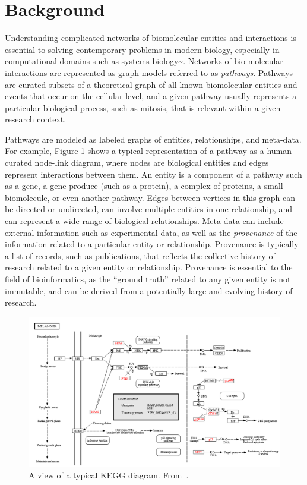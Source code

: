 \section*{Background}

Understanding complicated networks of biomolecular entities and
interactions is essential to solving contemporary problems in modern
biology, especially in computational domains such as systems
biology\textasciitilde{}\cite{hanahan2011hallmarks}. Networks of
bio-molecular interactions are represented as graph models referred to
as \emph{pathways}. Pathways are curated subsets of a theoretical graph
of all known biomolecular entities and events that occur on the cellular
level, and a given pathway usually represents a particular biological
process, such as mitosis, that is relevant within a given research
context.

Pathways are modeled as labeled graphs of entities, relationships, and
meta-data. For example, Figure \ref{fig:kvik} shows a typical
representation of a pathway as a human curated node-link diagram, where
nodes are biological entities and edges represent interactions between
them. An entity is a component of a pathway such as a gene, a gene
produce (such as a protein), a complex of proteins, a small biomolecule,
or even another pathway. Edges between vertices in this graph can be
directed or undirected, can involve multiple entities in one
relationship, and can represent a wide range of biological
relationships. Meta-data can include external information such as
experimental data, as well as the \emph{provenance} of the information
related to a particular entity or relationship. Provenance is typically
a list of records, such as publications, that reflects the collective
history of research related to a given entity or relationship.
Provenance is essential to the field of bioinformatics, as the ``ground
truth'' related to any given entity is not immutable, and can be derived
from a potentially large and evolving history of research.

\begin{figure}[htb]
  \centering
  \includegraphics[width=\linewidth]{figures/kegg2}
  \caption{\label{fig:kvik} A view of a typical KEGG diagram. From~\cite{Fjukstad2014kvik}.}
\end{figure}


